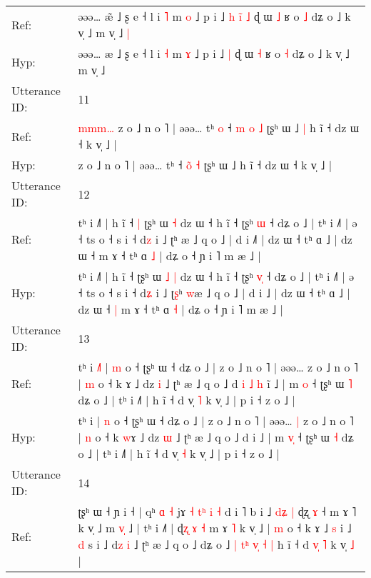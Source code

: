 \documentclass[10pt]{article}
\DeclareRobustCommand{\hl}[1]{{\textcolor{red}{#1}}}
\begin{document}
\begin{longtable}{ll}
Ref: & əəə… æ\hl{̃} ˩ ʂ e ˧ l i \hl{˥} m \hl{o} ˩ p i ˩\hl{ }\hl{h}\hl{ }\hl{i}\hl{̃} \hl{˩} ɖ ɯ \hl{˩} ʁ o \hl{˩} dʑ o ˩ k v̩ ˩ m v̩ ˩\hl{ }\hl{|}
 \\
Hyp: & əəə… æ\hl{} ˩ ʂ e ˧ l i \hl{˧} m \hl{ɤ} ˩ p i ˩\hl{}\hl{}\hl{}\hl{}\hl{} \hl{|} ɖ ɯ \hl{˧} ʁ o \hl{˧} dʑ o ˩ k v̩ ˩ m v̩ ˩\hl{}\hl{}
 \\
\midrule
Utterance ID: & 11 \\
Ref: & \hl{m}\hl{m}\hl{m}\hl{…}\hl{ }z o ˩ n o ˥ | əəə… tʰ\hl{ }\hl{o} ˧ \hl{m}\hl{ }\hl{o} \hl{˩} ʈʂʰ ɯ ˩\hl{ }\hl{|} h ĩ ˧ dz ɯ ˧ k v̩ ˩ |
 \\
Hyp: & \hl{}\hl{}\hl{}\hl{}\hl{}z o ˩ n o ˥ | əəə… tʰ\hl{}\hl{} ˧ \hl{}\hl{o}\hl{̃} \hl{˧} ʈʂʰ ɯ ˩\hl{}\hl{} h ĩ ˧ dz ɯ ˧ k v̩ ˩ |
 \\
\midrule
Utterance ID: & 12 \\
Ref: & tʰ i ˩˥ | h ĩ ˧\hl{ }\hl{|} ʈʂʰ ɯ\hl{}\hl{} \hl{˧} dz ɯ ˧ h ĩ ˧ ʈʂʰ \hl{}\hl{ɯ} ˧ dʑ o ˩ | tʰ i ˩˥ | ə ˧ ts o ˧ s i ˧ d\hl{z} i ˩ ʈ\hl{}ʰ \hl{}æ ˩ q o ˩ | d i ˩\hl{˥} | dz ɯ ˧ tʰ ɑ ˩ | dz ɯ ˧\hl{}\hl{} m ɤ ˧ tʰ ɑ \hl{˩} | dʑ o ˧ ɲ i ˥ m æ ˩ |
 \\
Hyp: & tʰ i ˩˥ | h ĩ ˧\hl{}\hl{} ʈʂʰ ɯ\hl{ }\hl{˩} \hl{|} dz ɯ ˧ h ĩ ˧ ʈʂʰ \hl{v}\hl{̩} ˧ dʑ o ˩ | tʰ i ˩˥ | ə ˧ ts o ˧ s i ˧ d\hl{ʑ} i ˩ ʈ\hl{ʂ}ʰ \hl{w}æ ˩ q o ˩ | d i ˩\hl{} | dz ɯ ˧ tʰ ɑ ˩ | dz ɯ ˧\hl{ }\hl{|} m ɤ ˧ tʰ ɑ \hl{˧} | dʑ o ˧ ɲ i ˥ m æ ˩ |
 \\
\midrule
Utterance ID: & 13 \\
Ref: & tʰ i\hl{ }\hl{˩}\hl{˥} | \hl{m} o ˧ ʈʂʰ ɯ ˧ dʑ o ˩ | z o ˩ n o ˥ | əəə…\hl{}\hl{} z o ˩ n o ˥ | \hl{m} o ˧ k \hl{}ɤ ˩ dz \hl{i} ˩ ʈʰ æ ˩ q o ˩ d\hl{ }\hl{i}\hl{ }\hl{˩}\hl{ }\hl{h} i\hl{̃} ˩ | m \hl{}\hl{o} ˧ ʈʂʰ ɯ \hl{˥} dʑ o ˩ | tʰ i ˩˥ | h ĩ ˧ d v̩ \hl{˥} k v̩ ˩ | p i ˧ z o ˩ |
 \\
Hyp: & tʰ i\hl{}\hl{}\hl{} | \hl{n} o ˧ ʈʂʰ ɯ ˧ dʑ o ˩ | z o ˩ n o ˥ | əəə…\hl{ }\hl{|} z o ˩ n o ˥ | \hl{n} o ˧ k \hl{w}ɤ ˩ dz \hl{ɯ} ˩ ʈʰ æ ˩ q o ˩ d\hl{}\hl{}\hl{}\hl{}\hl{}\hl{} i\hl{} ˩ | m \hl{v}\hl{̩} ˧ ʈʂʰ ɯ \hl{˧} dʑ o ˩ | tʰ i ˩˥ | h ĩ ˧ d v̩ \hl{˧} k v̩ ˩ | p i ˧ z o ˩ |
 \\
\midrule
Utterance ID: & 14 \\
Ref: & ʈʂʰ ɯ ˧ ɲ i ˧ | qʰ \hl{ɑ}\hl{ }\hl{˧} jɤ \hl{˧} \hl{t}\hl{ʰ} \hl{i} \hl{˧} d i ˥ b i ˩\hl{}\hl{} \hl{d}\hl{ʑ}\hl{ }\hl{|} ɖʐ \hl{ɤ} ˧ m ɤ ˥ k v̩ ˩ m \hl{v}\hl{̩} ˩ | tʰ i ˩˥ | ɖ\hl{ʐ} \hl{ɤ} \hl{˧} m ɤ \hl{˥} k v̩ ˩ | \hl{m} o ˧ k ɤ ˩ \hl{s} i ˩ \hl{d} \hl{}s\hl{} i ˩ d\hl{z} \hl{i} ˩ ʈʰ æ ˩ q o ˩ dʑ o ˩\hl{ }\hl{|}\hl{ }\hl{t}\hl{ʰ} \hl{v}\hl{̩}\hl{ }\hl{˧} \hl{|} h ĩ ˧ d \hl{v}\hl{̩} \hl{˥} k v̩ \hl{˩} |

\end{longtable}
\end{document}
